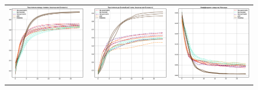 \begin{figure}
\begin{tabular}{ccc}
    \includegraphics[width=55mm]{images/CH4_baselines_diversity_cosine_False.eps} &   \includegraphics[width=55mm]{images/CH4_baselines_diversity_cosine_True.eps} & \includegraphics[width=55mm]{images/CH4_baselines_jaccard_sim_30.eps} \\
    

\end{tabular}
\end{figure}
